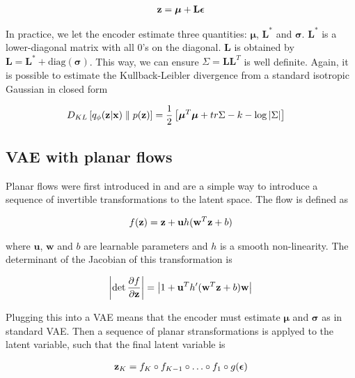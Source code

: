 \documentclass[12pt]{article}
\begin{document}
\begin{align}
    \textbf{z} = \boldsymbol{\mu} + \mathbf{L}\bm{\epsilon}
\end{align}

In practice, we let the encoder estimate three quantities: \(\boldsymbol{\mu}\), \(\mathbf{L}^*\) and \(\boldsymbol{\sigma}\). \(\mathbf{L}^*\) is a lower-diagonal matrix with all 0's on the diagonal. \(\mathbf{L}\) is obtained by \(\mathbf{L} = \mathbf{L}^* + \text{diag}(\boldsymbol{\sigma})\). This way, we can ensure \(\Sigma = \mathbf{L}\mathbf{L}^T\) is well definite. Again, it is possible to estimate the Kullback-Leibler divergence from a standard isotropic Gaussian in closed form

\begin{align}
    D_{KL} \left[ q_{\phi}(\textbf{z}|\textbf{x}) \parallel p(\textbf{z}) \right] &= \frac{1}{2}\left[\boldsymbol{\mu}^T \boldsymbol{\mu} + tr{\Sigma} - k - \log \left| \Sigma \right| \right] 
\end{align}


\subsection{VAE with planar flows}

Planar flows were first introduced in \cite{Mohamed2015VariationalIM} and are a simple way to introduce a sequence of invertible transformations to the latent space. The flow is defined as

\begin{align}
    f(\textbf{z}) = \textbf{z} + \mathbf{u}h(\mathbf{w}^T\textbf{z} + b)
\end{align}

where \(\mathbf{u}\), \(\mathbf{w}\) and \(b\) are learnable parameters and \(h\) is a smooth non-linearity. The determinant of the Jacobian of this transformation is

\begin{align}
    \left| \det \frac{\partial f}{\partial \textbf{z}} \right| = \left| 1 + \mathbf{u}^T h'(\mathbf{w}^T\textbf{z} + b)\mathbf{w} \right|
\end{align}


Plugging this into a VAE means that the encoder must estimate \(\boldsymbol{\mu}\) and \(\boldsymbol{\sigma}\) as in standard VAE. Then a sequence of planar stransformations is applyed to the latent variable, such that the final latent variable is 

\begin{align}
    \textbf{z}_K = f_K \circ f_{K-1} \circ \ldots \circ f_1 \circ g(\bm{\epsilon})
\end{align}
\end{document}
